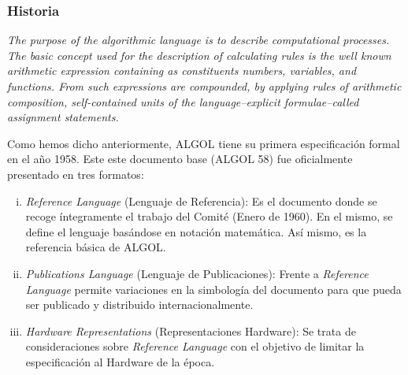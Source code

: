 \subsubsection{Historia}

\textit{The purpose of the algorithmic language is to describe computational
processes.
The basic concept used for the description of calculating rules is the well
known
arithmetic expression containing as constituents numbers, variables, and functions. From such expressions are compounded, by applying rules of arithmetic
composition, self-contained units of the language--explicit formulae--called
assignment statements.}  \cite{article/algol/ralgol60}

Como hemos dicho anteriormente, ALGOL tiene su primera especificación formal en
el año 1958. Este este documento base (ALGOL 58) fue oficialmente presentado en
tres formatos:

\begin{enumerate} [i.]

\item \textit{Reference Language} (Lenguaje de Referencia): Es el documento donde se recoge íntegramente el trabajo del Comité (Enero de 1960). En el mismo, se define el lenguaje basándose en notación matemática. Así mismo, es la referencia básica de ALGOL.

\item \textit{Publications Language} (Lenguaje de Publicaciones): Frente a \textit{Reference Language} permite variaciones en la simbología del documento para que pueda ser publicado y distribuido internacionalmente.

\item \textit{Hardware Representations} (Representaciones Hardware): Se trata de consideraciones sobre \textit{Reference Language} con el objetivo de limitar la especificación al Hardware de la época.



\end{enumerate}

